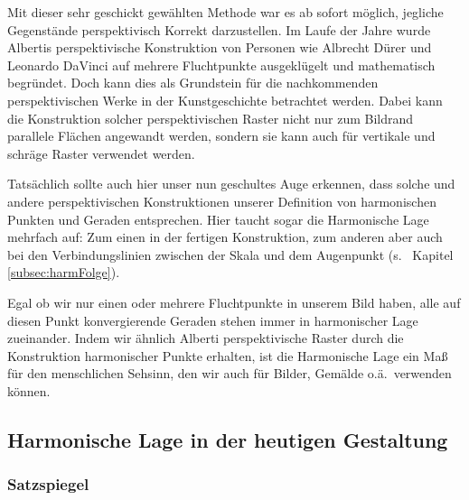 \documentclass[12pt,a4paper]{article}
\begin{document}
Mit dieser sehr geschickt gewählten Methode war es ab sofort möglich, jegliche Gegenstände perspektivisch Korrekt darzustellen. Im Laufe der Jahre wurde Albertis perspektivische Konstruktion von Personen wie Albrecht Dürer und Leonardo DaVinci auf mehrere Fluchtpunkte ausgeklügelt und mathematisch begründet. Doch kann dies als Grundstein für die nachkommenden perspektivischen Werke in der Kunstgeschichte betrachtet werden. Dabei kann die Konstruktion solcher perspektivischen Raster nicht nur zum Bildrand parallele Flächen angewandt werden, sondern sie kann auch für vertikale und schräge Raster verwendet werden.


Tatsächlich sollte auch hier unser nun geschultes Auge erkennen, dass solche und andere perspektivischen Konstruktionen unserer Definition von harmonischen Punkten und Geraden entsprechen. Hier taucht sogar die Harmonische Lage mehrfach auf: Zum einen in der fertigen Konstruktion, zum anderen aber auch bei den Verbindungslinien zwischen der Skala und dem Augenpunkt (s.~ Kapitel \ref{subsec:harmFolge}).

Egal ob wir nur einen oder mehrere Fluchtpunkte in unserem Bild haben, alle auf diesen Punkt konvergierende Geraden stehen immer in harmonischer Lage zueinander. Indem wir ähnlich Alberti perspektivische Raster durch die Konstruktion harmonischer Punkte erhalten, ist die Harmonische Lage ein Maß für den menschlichen Sehsinn, den wir auch für Bilder, Gemälde o.ä.~verwenden können.

\newpage
\subsection{Harmonische Lage in der heutigen Gestaltung}

\subsubsection{Satzspiegel}
\end{document}
